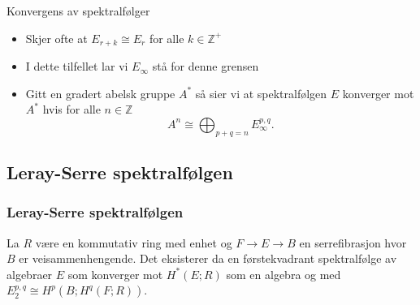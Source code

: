\documentclass[UKenglish]{beamer}
\begin{document}
\begin{frame}[c]{Konvergens av spektralfølger}
    \begin{itemize}
        \item Skjer ofte at \( E_{r+k}\cong E_r \) for alle \( k\in\mathbb{Z}^+ \) 
        \pause
        \item I dette tilfellet lar vi \( E_\infty \) stå for denne
        grensen
        \pause
    \item Gitt en gradert abelsk gruppe \( A^* \) så sier vi at spektralfølgen 
        \( E \) konverger mot \( A^* \) hvis for alle \( n\in\mathbb{Z} \) 
        \begin{equation}
            A^n \cong \bigoplus_{p+q =n} E_\infty^{p,q}.
        \end{equation}
    \end{itemize}
\end{frame}

\subsection{Leray-Serre spektralfølgen}

\begin{frame}[c]
    \frametitle{Leray-Serre spektralfølgen}
    \begin{theorem}[]
       La \( R \) være en kommutativ ring med enhet og 
       \( F\rightarrow E \rightarrow B \) en serrefibrasjon
       hvor \( B \) er veisammenhengende. Det eksisterer da en førstekvadrant
       spektralfølge av algebraer \( E \) som konverger mot \( H^*(E;R) \)
       som en algebra og med \( E_2^{p,q}\cong H^p(B; H^q(F;R)) \).

    \end{theorem} 
\end{frame}
\end{document}
